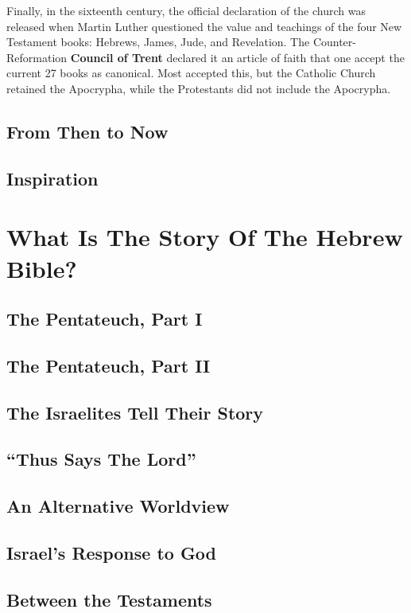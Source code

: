 \documentclass{report}
\begin{document}
        Finally, in the sixteenth century, the official declaration of the church was released when Martin Luther questioned the value and teachings of the four New Testament books: Hebrews, James, Jude, and Revelation. The Counter-Reformation \textbf{Council of Trent} declared it an article of faith that one accept the current 27 books as canonical. Most accepted this, but the Catholic Church retained the Apocrypha, while the Protestants did not include the Apocrypha.

    \chapter{From Then to Now}
    \chapter{Inspiration}

\part{What Is The Story Of The Hebrew Bible?}

    \chapter{The Pentateuch, Part I}
    \chapter{The Pentateuch, Part II}
    \chapter{The Israelites Tell Their Story}
    \chapter{``Thus Says The Lord''}
    \chapter{An Alternative Worldview}
    \chapter{Israel's Response to God}
    \chapter{Between the Testaments}
\end{document}
